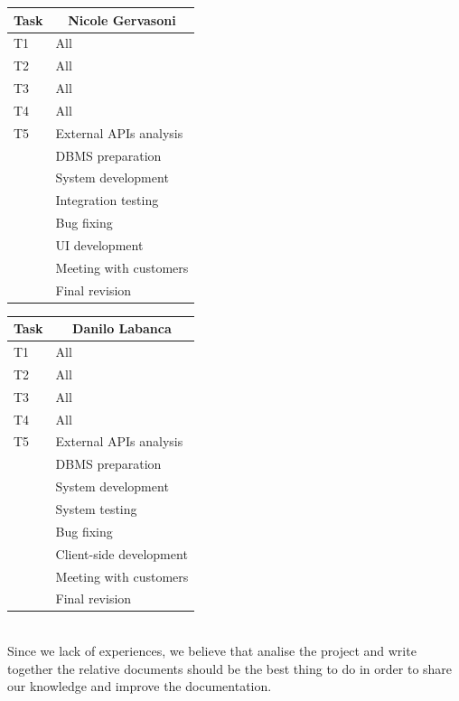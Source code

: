 \documentclass[english]{article}
\begin{document}
\begin{center}
	\begin{tabular}{|p{2cm}|p{4cm}|}
		\hline
		\multicolumn{1}{|c|}{\textbf{Task}} & \multicolumn{1}{c|}{\textbf{Nicole Gervasoni}}\\
		\hline
		T1 & All\\
		\hline
		T2 & All\\
		\hline
		T3 & All\\
		\hline
		T4 & All\\
		\hline
		T5 & External APIs analysis\\
		\hline
		& DBMS preparation\\
		\hline
		& System development\\
		\hline
		& Integration testing\\
		\hline
		& Bug fixing\\
		\hline
		& UI development\\
		\hline
		& Meeting with customers\\
		\hline
		& Final revision\\
		\hline
	\end{tabular}
\end{center}

\begin{center}
	\begin{tabular}{|p{2cm}|p{4cm}|}
		\hline
		\multicolumn{1}{|c|}{\textbf{Task}} & \multicolumn{1}{c|}{\textbf{Danilo Labanca}}\\
		\hline
		T1 & All\\
		\hline
		T2 & All\\
		\hline
		T3 & All\\
		\hline
		T4 & All\\
		\hline
		T5 & External APIs analysis\\
		\hline
		& DBMS preparation\\
		\hline
		& System development\\
		\hline
		& System testing\\
		\hline
		& Bug fixing\\
		\hline
		& Client-side development\\
		\hline
		& Meeting with customers\\
		\hline
		& Final revision\\
		\hline
	\end{tabular}
\end{center}

\\
Since we lack of experiences, we believe that analise the project and write together the relative documents should be the best thing to do in order to share our knowledge and improve the documentation.
\end{document}

